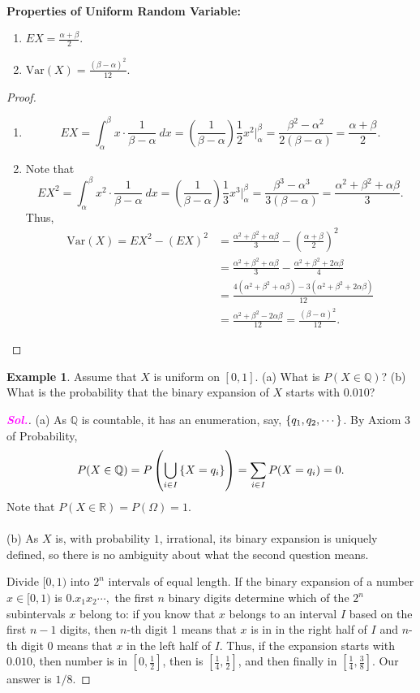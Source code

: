 \documentclass[12pt,a4paper]{article}
\theoremstyle{definition}
\newtheorem{example}{Example}[section]
\theoremstyle{definition}
\theoremstyle{definition}
\theoremstyle{definition}
\theoremstyle{remark}
\theoremstyle{definition}
\newcommand{\dispsty}{\displaystyle}
\newcommand{\sol}{\textcolor{magenta}{\bf \textit{Sol.}}\quad}
\newcommand{\Var}{\text{Var}}
\begin{document}
\
\begin{tcolorbox}[colback=white]\textbf{
	Properties of Uniform Random Variable:}\begin{enumerate}
	\item $EX=\dispsty\frac{\alpha+\beta}{2}$.
	\item $\Var(X)=\dispsty\frac{(\beta-\alpha)^2}{12}$.
\end{enumerate}
\end{tcolorbox}
\begin{proof}
	\begin{enumerate}
		\item \[
		EX=\int_\alpha^\beta x\cdot\frac{1}{\beta-\alpha}\ dx=\left(\frac{1}{\beta-\alpha}\right)\frac{1}{2}x^2\Bigg|_\alpha^\beta=\frac{\beta^2-\alpha^2}{2(\beta-\alpha)}=\frac{\alpha+\beta}{2}.
		\]
		\item Note that \[
		EX^2=\int_\alpha^\beta x^2\cdot\frac{1}{\beta-\alpha}\ dx=\left(\frac{1}{\beta-\alpha}\right)\frac{1}{3}x^3\Bigg|_\alpha^\beta=\frac{\beta^3-\alpha^3}{3(\beta-\alpha)}=\frac{\alpha^2+\beta^2+\alpha\beta}{3}.
		\] Thus, \begin{align*}
		\Var(X)=EX^2-(EX)^2&=\frac{\alpha^2+\beta^2+\alpha\beta}{3}-\left(\frac{\alpha+\beta}{2}\right)^2\\
		&=\frac{\alpha^2+\beta^2+\alpha\beta}{3}-\frac{\alpha^2+\beta^2+2\alpha\beta}{4}\\
		&=\frac{4(\alpha^2+\beta^2+\alpha\beta)-3(\alpha^2+\beta^2+2\alpha\beta)}{12}\\
		&=\frac{\alpha^2+\beta^2-2\alpha\beta}{12}=\frac{(\beta-\alpha)^2}{12}.
		\end{align*}
	\end{enumerate}
\end{proof}
\begin{example}
	Assume that $X$ is uniform on $[0,1]$. (a) What is $P(X\in\mathbb{Q})$? (b) What is the probability that the binary expansion of $X$ starts with $0.010$?\begin{proof}[\sol]
		(a) As $\mathbb{Q}$ is countable, it has an enumeration, say, $\set{q_1,q_2,\cdots}$. By Axiom 3 of Probability, \[
		P(X\in\mathbb{Q})=P\left(\bigcup_{i\in I}\set{X=q_i}\right)=\sum_{i\in I}P(X=q_i)=0.
		\] Note that $P(X\in\mathbb{R})=P(\Omega)=1$.\\
		\\
		(b) As $X$ is, with probability $1$, irrational, its binary expansion is uniquely defined, so there is no ambiguity about what the second question means.\par
		Divide $[0,1)$ into $2^n$ intervals of equal length. If the binary expansion of a number $x\in[0,1)$ is $0.x_1x_2\cdots,$ the first $n$ binary digits determine which of the $2^n$ subintervals $x$ belong to: if you know that $x$ belongs to an interval $I$ based on the first $n-1$ digits, then $n$-th digit 1 means that $x$ is in in the right half of $I$ and $n$-th digit 0 means that $x$ in the left half of $I$. Thus, if the expansion starts with $0.010$, then number is in $\left[0,\frac{1}{2}\right]$, then is $\left[\frac{1}{4},\frac{1}{2}\right]$, and then finally in $\left[\frac{1}{4},\frac{3}{8}\right]$. Our answer is $1/8$.
	\end{proof}
\end{example}
\end{document}

